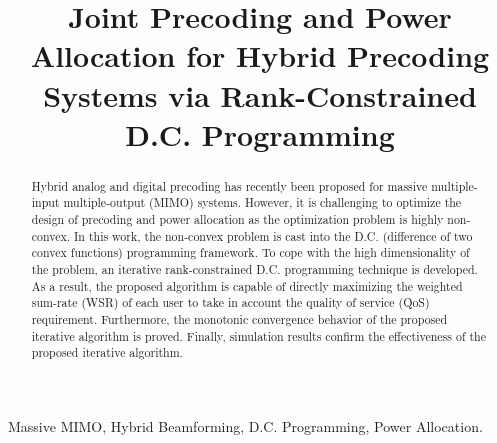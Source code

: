 \documentclass[10pt,journal,twocolumn,twoside]{IEEEtran}
\begin{document}
\title{Joint Precoding and Power Allocation for Hybrid Precoding Systems via Rank-Constrained D.C. Programming}
\author{}
\maketitle\thispagestyle{plain}\pagestyle{plain}

\begin{abstract}
Hybrid analog and digital precoding has recently been proposed for massive multiple-input multiple-output (MIMO) systems. However, it is challenging to optimize the design of precoding and power allocation as the optimization problem is highly non-convex. In this work, the non-convex problem is cast into the D.C. (difference of two convex functions) programming framework. To cope with the high dimensionality of the problem, an iterative rank-constrained D.C. programming technique is developed. As a result, the proposed algorithm is capable of directly maximizing the weighted sum-rate (WSR) of each user to take in account the quality of service (QoS) requirement. Furthermore, the monotonic convergence behavior of the proposed iterative algorithm is proved. Finally, simulation results confirm the effectiveness of the proposed iterative algorithm.
\end{abstract}


\begin{IEEEkeywords}
	Massive MIMO, Hybrid Beamforming, D.C. Programming, Power Allocation.
\end{IEEEkeywords}

\end{document}
